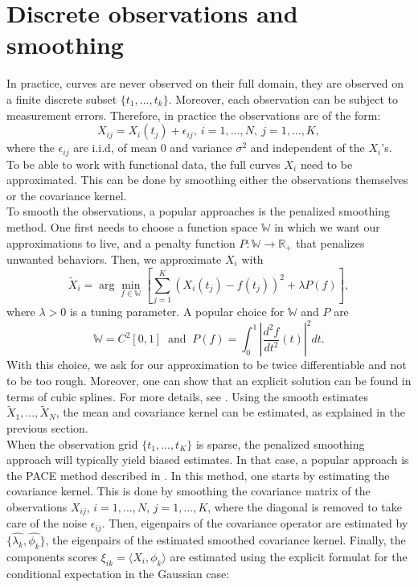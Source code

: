 \documentclass[10pt, a4paper]{report}
\newcommand{\R}[0]{\mathbb{R}}
\theoremstyle{definition}
\theoremstyle{remark}
\begin{document}
\section{Discrete observations and smoothing}
In practice, curves are never observed on their full domain, they are observed on a finite discrete subset $\{t_1,...,t_k\}$. Moreover, each observation can be subject to measurement errors. Therefore, in practice the observations are of the form:
$$X_{ij}=X_i(t_j) + \epsilon_{ij}, \ i=1,...,N,\ j=1,...,K,$$
where the $\epsilon_{ij}$ are i.i.d, of mean 0 and variance $\sigma^2$ and independent of the $X_i$'s.\\
To be able to work with functional data, the full curves $X_i$ need to be approximated. This can be done by smoothing either the observations themselves or the covariance kernel.\\
To smooth the observations, a popular approaches is the penalized smoothing method. One first needs to choose a function space $\mathbb{W}$ in which we want our approximations to live, and a penalty function $P:\mathbb{W}\to \R_+$ that penalizes unwanted behaviors. Then, we approximate $X_i$ with 
$$\tilde{X}_i = \arg\min_{f \in \mathbb{W}}\left[ \sum_{j=1}^{K}(X_i(t_j)-f(t_j))^2 + \lambda P(f) \right],$$ 
where $\lambda >0$ is a tuning parameter. A popular choice for $\mathbb{W}$ and $P$ are 
$$\mathbb{W}=C^2[0,1] \ \text{ and } \ P(f) = \int_{0}^{1}\left\vert \frac{d^2 f}{dt^2}(t)\right\vert^2 dt.$$
With this choice, we ask for our approximation to be twice differentiable and not to be too rough. Moreover, one can show that an explicit solution can be found in terms of cubic splines. For more details, see \cite[Chapter 5]{fdaram}. Using the smooth estimates $\tilde{X}_1,...,\tilde{X}_N$, the mean and covariance kernel can be estimated, as explained in the previous section.\\
When the observation grid $\{t_1,...,t_K\}$ is sparse, the penalized smoothing approach will typically yield biased estimates. In that case, a popular approach is the PACE method described in \cite{pace}. In this method, one starts by estimating the covariance kernel. This is done by smoothing the covariance matrix of the observations $X_{ij}$, $i=1,...,N$, $j=1,...,K$, where the diagonal is removed to take care of the noise $\epsilon_{ij}$. Then, eigenpairs of the covariance operator are estimated by $\{\hat{\lambda_k},\hat{\phi_k}\}$, the eigenpairs of the estimated smoothed covariance kernel. Finally, the components scores $\xi_{ik} = \langle X_i, \phi_k\rangle$ are estimated using the explicit formulat for the conditional expectation in the Gaussian case:
\end{document}
